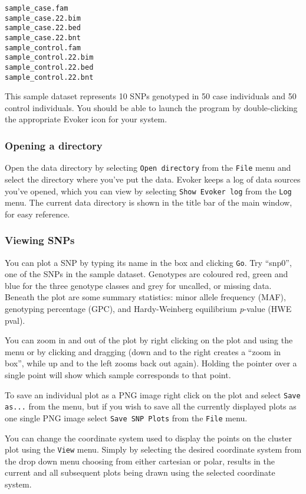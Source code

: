 \documentclass{article}
\begin{document}
\begin{verbatim}
sample_case.fam
sample_case.22.bim
sample_case.22.bed
sample_case.22.bnt
sample_control.fam
sample_control.22.bim
sample_control.22.bed
sample_control.22.bnt
\end{verbatim}

This sample dataset represents 10 SNPs genotyped in 50 case individuals and 50 control individuals. You should be able to launch the program by double-clicking the appropriate Evoker icon for your system.

\subsubsection{Opening a directory}
Open the data directory by selecting \texttt{Open directory} from the \texttt{File} menu and select the directory where you've put the data. Evoker keeps a log of data sources you've opened, which you can view by selecting \texttt{Show Evoker log} from the \texttt{Log} menu. The current data directory is shown in the title bar of the main window, for easy reference.

\subsubsection{Viewing SNPs}
You can plot a SNP by typing its name in the box and clicking \texttt{Go}. Try ``snp0'', one of the SNPs in the sample dataset. Genotypes are coloured red, green and blue for the three genotype classes and grey for uncalled, or missing data. Beneath the plot are some summary statistics: minor allele frequency (MAF), genotyping percentage (GPC), and Hardy-Weinberg equilibrium \emph{p}-value (HWE pval). 
 
You can zoom in and out of the plot by right clicking on the plot and using the menu or by clicking and dragging (down and to the right creates a ``zoom in box'', while up and to the left zooms back out again). Holding the pointer over a single point will show which sample corresponds to that point.

To save an individual plot as a PNG image right click on the plot and select \texttt{Save as...} from the menu, but if you wish to save all the currently displayed plots as one single PNG image select \texttt{Save SNP Plots} from the \texttt{File} menu.

You can change the coordinate system used to display the points on the cluster plot using the \texttt{View} menu. Simply by selecting the desired coordinate system from the drop down menu choosing from either cartesian or polar, results in the current and all subsequent plots being drawn using the selected coordinate system. 
\end{document}
